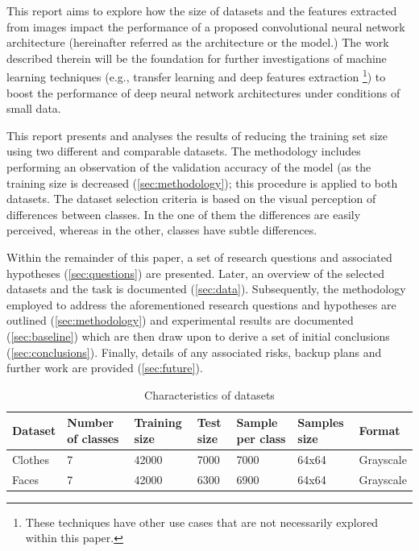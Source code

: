 \documentclass{article}
\begin{document}
This report aims to explore how the size of datasets and the features extracted from images impact the performance of a proposed convolutional neural network architecture (hereinafter referred as the architecture or the model.) The work described therein will be the foundation for further investigations of machine learning techniques (e.g., transfer learning and deep features extraction \footnote{These techniques have other use cases that are not necessarily explored within this paper.}) to boost the performance of deep neural network architectures under conditions of small data. 

This report presents and analyses the results of reducing the training set size using two different and comparable datasets. The methodology includes performing an observation of the validation accuracy of the model (as the training size is decreased (\ref{sec:methodology}); this procedure is applied to both datasets. The dataset selection criteria is based on the visual perception of differences between classes. In the one of them the differences are easily perceived, whereas in the other, classes have subtle differences.

Within the remainder of this paper, a set of research questions and associated hypotheses (\ref{sec:questions}) are presented. Later, an overview of the selected datasets and the task is documented (\ref{sec:data}). Subsequently, the methodology employed to address the aforementioned research questions and hypotheses are outlined (\ref{sec:methodology}) and experimental results are documented (\ref{sec:baseline}) which are then draw upon to derive a set of initial conclusions (\ref{sec:conclusions}). Finally, details of any associated risks, backup plans and further work are provided (\ref{sec:future}).
 
\begin{table}[!htb]
  \centering
  \begin{tabular}{| l | l | l | l | l | l | l |}
    \hline
    \textbf{Dataset} & \textbf{Number of classes} & \textbf{Training size} & \textbf{Test size}  &  \textbf{Sample per class} & \textbf{Samples size} & \textbf{Format} \\ \hline
    Clothes & 7 & 42000 & 7000 & 7000 & 64x64 & Grayscale\\ \hline
    Faces & 7 & 42000 & 6300 & 6900 & 64x64 & Grayscale\\ \hline
  \end{tabular}
  \caption{Characteristics of datasets}
  \label{tab:1}
\end{table}
\end{document}
